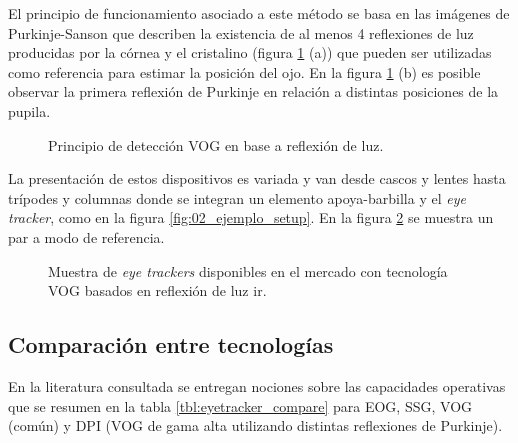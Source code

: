 \documentclass[../Main.tex]{subfiles}
\begin{document}
\begin{enumerate}
				El principio de funcionamiento asociado a este método se basa en las imágenes de Purkinje-Sanson que describen la existencia de al menos 4 reflexiones de luz producidas por la córnea y el cristalino (figura \ref{fig:02_et_vog1} (a)) que pueden ser utilizadas como referencia para estimar la posición del ojo. En la figura \ref{fig:02_et_vog1} (b) es posible observar la primera reflexión de Purkinje en relación a distintas posiciones de la pupila.
				\begin{figure}[H]
					\centering
					\hfill
					\caption[Principio de detección VOG en base a reflexión de luz]{Principio de detección VOG en base a reflexión de luz\cite{dissertation:eyetrackers}.}
					\label{fig:02_et_vog1}
				\end{figure}

				La presentación de estos dispositivos es variada y van desde cascos y lentes hasta trípodes y columnas donde se integran un elemento apoya-barbilla y el \textit{eye tracker}, como en la figura \ref{fig:02_ejemplo_setup}. En la figura \ref{fig:02_et_vog2} se muestra un par a modo de referencia. 
				\begin{figure}[H]
					\centering
					\hspace{5mm}
					\caption[Muestra de \textit{eye trackers} disponibles en el mercado con tecnología VOG basados en reflexión de luz \acrshort{ir}]{Muestra de \textit{eye trackers} disponibles en el mercado con tecnología VOG basados en reflexión de luz \acrshort{ir}\footnotemark.}
					\label{fig:02_et_vog2}
				\end{figure}

			\end{enumerate}

		\subsection{Comparación entre tecnologías}
		\label{sub:02_comparativa_eyetracker}
			En la literatura consultada \cite{dissertation:eyetrackers, article:eyetracker_eggert, article:eyetracker_richardson} se entregan nociones sobre las capacidades operativas que se resumen en la tabla \ref{tbl:eyetracker_compare} para EOG, SSG, VOG (común) y DPI (VOG de gama alta utilizando distintas reflexiones de Purkinje). 
\end{document}
